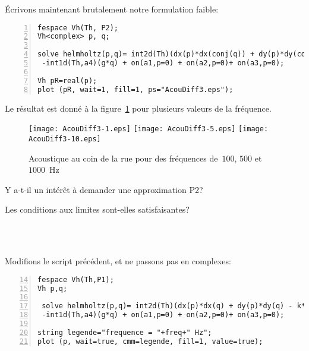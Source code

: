 \medskip
Écrivons maintenant brutalement notre formulation faible:
\scriptsize
\begin{Verbatim}[numbers=left,numbersep=3pt,firstnumber=last]
fespace Vh(Th, P2);
Vh<complex> p, q;

solve helmholtz(p,q)= int2d(Th)(dx(p)*dx(conj(q)) + dy(p)*dy(conj(q)) - k*k*p*conj(q) )
 -int1d(Th,a4)(g*q) + on(a1,p=0) + on(a2,p=0)+ on(a3,p=0);
 
Vh pR=real(p);
plot (pR, wait=1, fill=1, ps="AcouDiff3.eps");
\end{Verbatim}
\normalsize
Le résultat est donné à la figure~\ref{Fig-AcouDiff3} pour plusieurs valeurs de la fréquence.
\begin{figure}[h!]
\centering
   \texttt{[image: AcouDiff3-1.eps]}\hfill
   \texttt{[image: AcouDiff3-5.eps]}\hfill
   \texttt{[image: AcouDiff3-10.eps]}
\caption{Acoustique au coin de la rue pour des fréquences de~$100$, $500$ et $1000$~Hz}\label{Fig-AcouDiff3}
\end{figure}

\medskip
Y a-t-il un intérêt à demander une approximation P2?
\begin{flushright}
\end{flushright}

Les conditions aux limites sont-elles satisfaisantes?
\begin{flushright}
\\ 
\\
\end{flushright}

\medskip
Modifions le script précédent, et ne passons pas en complexes:
\scriptsize
\begin{Verbatim}[numbers=left,numbersep=3pt,firstnumber=14]
fespace Vh(Th,P1);
Vh p,q;

 solve helmholtz(p,q)= int2d(Th)(dx(p)*dx(q) + dy(p)*dy(q) - k*k*p*q )
 -int1d(Th,a4)(g*q) + on(a1,p=0) + on(a2,p=0)+ on(a3,p=0);

string legende="frequence = "+freq+" Hz";
plot (p, wait=true, cmm=legende, fill=1, value=true);
\end{Verbatim}
\normalsize

